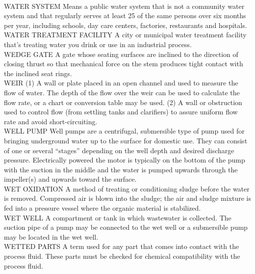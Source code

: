 \vspace{0.3cm}\\
WATER SYSTEM
Means a public water system that is not a community water system and that regularly serves at least 25 of the same persons over six months per year, including schools, day care centers, factories, restaurants and hospitals.
\vspace{0.3cm}\\
WATER TREATMENT FACILITY
A city or municipal water treatment facility that’s treating water you drink or use in an industrial process.
\vspace{0.3cm}\\
WEDGE GATE
A gate whose seating surfaces are inclined to the direction of closing thrust so that mechanical force on the stem produces tight contact with the inclined seat rings.
\vspace{0.3cm}\\
WEIR
(1) A wall or plate placed in an open channel and used to measure the flow of water. The depth of the flow over the weir can be used to calculate the flow rate, or a chart or conversion table may be used. (2) A wall or obstruction used to control flow (from settling tanks and clarifiers) to assure uniform flow rate and avoid short-circuiting.
\vspace{0.3cm}\\
WELL PUMP
Well pumps are a centrifugal, submersible type of pump used for bringing underground water up to the surface for domestic use. They can consist of one or several “stages” depending on the well depth and desired discharge pressure. Electrically powered the motor is typically on the bottom of the pump with the suction in the middle and the water is pumped upwards through the impeller(s) and upwards toward the surface.
\vspace{0.3cm}\\
WET OXIDATION
A method of treating or conditioning sludge before the water is removed. Compressed air is blown into the sludge; the air and sludge mixture is fed into a pressure vessel where the organic material is stabilized.
\vspace{0.3cm}\\
WET WELL
A compartment or tank in which wastewater is collected. The suction pipe of a pump may be connected to the wet well or a submersible pump may be located in the wet well.
\vspace{0.3cm}\\
WETTED PARTS
A term used for any part that comes into contact with the process fluid. These parts must be checked for chemical compatibility with the process fluid.
